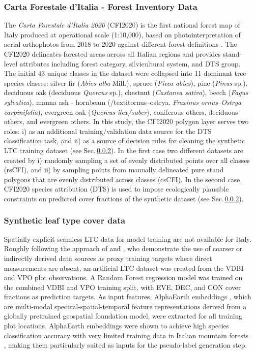 \documentclass[essd, manuscript]{copernicus}
\begin{document}
\subsubsection{Carta Forestale d'Italia - Forest Inventory Data}
\label{sec:cfi}
The \textit{Carta Forestale d'Italia 2020} (CFI2020) is the first national forest map of Italy produced at operational scale (1:10,000), based on photointerpretation of aerial orthophotos from 2018 to 2020 against different forest definitions \citep{mattioli_carta_2025}. The CFI2020 delineates forested areas across all Italian regions and provides stand-level attributes including forest category, silvicultural system, and DTS group. The initial 43 unique classes in the dataset were collapsed into 11 dominant tree species classes: silver fir (\textit{Abies alba} Mill.), spruce (\textit{Picea abies}), pine (\textit{Pinus} sp.), deciduous oak (deciduous \textit{Quercus} sp.), chestnut (\textit{Castanea sativa}), beech (\textit{Fagus sylvatica}), manna ash - hornbeam (/textit{ornus--ostrya}, \textit{Fraxinus ornus--Ostrya carpinifolia}), evergreen oak (\textit{Quercus ilex/suber}), coniferous others, deciduous others, and evergreen others. In this study, the CFI2020 polygon layer serves two roles: i) as an additional training/validation data source for the DTS classification task, and ii) as a source of decision rules for cleaning the synthetic LTC training dataset (see Sec.\,\ref{sec:synthetic_ltc}). In the first case two different datasets are created by i) randomly sampling a set of evenly distributed points over all classes (rsCFI), and ii) by sampling points from manually delineated pure stand polygons that are evenly distributed across classes (csCFI). In the second case, CFI2020 species attribution (DTS) is used to impose ecologically plausible constraints on predicted cover fractions of the synthetic dataset (see Sec.\,\ref{sec:synthetic_ltc}). 


\subsubsection{Synthetic leaf type cover data}
\label{sec:synthetic_ltc}

Spatially explicit seamless LTC data for model training are not available for Italy. Roughly following the approach of \citet{kang_data-driven_2021} and \citet{tan_leveraging_2025}, who demonstrate the use of coarser or indirectly derived data sources as proxy training targets where direct measurements are absent, an artificial LTC dataset was created from the VDBI and VPO plot observations. A Random Forest regression model was trained on the combined VDBI and VPO training split, with EVE, DEC, and CON cover fractions as prediction targets. As input features, AlphaEarth embeddings \citep{brown_alphaearth_2025,hiebl_combining_2026}, which are multi-modal spectral-spatial-temporal feature representations derived from a globally pretrained geospatial foundation model, were extracted for all training plot locations. AlphaEarth embeddings were shown to achieve high species classification accuracy with very limited training data in Italian mountain forests \citep{ball_geospatial_2026}, making them particularly suited as inputs for the pseudo-label generation step.
\end{document}
